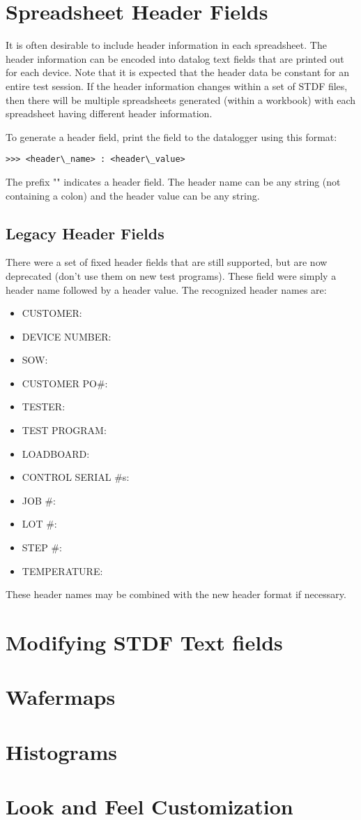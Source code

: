 \documentclass[letterpaper]{article}
\begin{document}
\section{Spreadsheet Header Fields}
It is often desirable to include header information in each spreadsheet.  The header information
can be encoded into datalog text fields that are printed out for each device.  Note that it is
expected that the header data be constant for an entire test session.  If the header information
changes within a set of STDF files, then there will be multiple spreadsheets generated (within a workbook)
with each spreadsheet having different header information.

To generate a header field, print the field to the datalogger using this format:
\begin{verbatim}
>>> <header\_name> : <header\_value>
\end{verbatim}
The prefix "\gT\gT\gT" indicates a header field.  The header name can be any string (not containing a colon)
and the header value can be any string.
\clearpage
\subsection{Legacy Header Fields}
There were a set of fixed header fields that are still supported, but are now deprecated (don't use them on new test programs).
These field were simply a header name followed by a header value.  The recognized header names
are:
\begin{itemize}
\item CUSTOMER:
\item DEVICE NUMBER:
\item SOW:
\item CUSTOMER PO\#:
\item TESTER:
\item TEST PROGRAM:
\item LOADBOARD:
\item CONTROL SERIAL \#s:
\item JOB \#:
\item LOT \#:
\item STEP \#:
\item TEMPERATURE:
\end{itemize}

These header names may be combined with the new header format if necessary.

\section{Modifying STDF Text fields}

\section{Wafermaps}


\section{Histograms}


\section{Look and Feel Customization}
\end{document}
